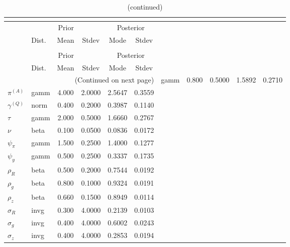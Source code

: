  
\begin{center}
\begin{longtable}{llcccc} 
\caption{Results from posterior maximization (parameters)}\\
 \label{Table:Posterior:1}\\
\toprule 
  & \multicolumn{3}{c}{Prior}  &  \multicolumn{2}{c}{Posterior} \\
  \cmidrule(r{.75em}){2-4} \cmidrule(r{.75em}){5-6}
  & Dist. & Mean  & Stdev & Mode & Stdev \\ 
\midrule \endfirsthead 
\caption{(continued)}\\
 \bottomrule 
  & \multicolumn{3}{c}{Prior}  &  \multicolumn{2}{c}{Posterior} \\
  \cmidrule(r{.75em}){2-4} \cmidrule(r{.75em}){5-6}
  & Dist. & Mean  & Stdev & Mode & Stdev \\ 
\midrule \endhead 
\bottomrule \multicolumn{6}{r}{(Continued on next page)}\endfoot 
\bottomrule\endlastfoot 
${r_{A}}$ & gamm &   0.800 & 0.5000 &   1.5892 &  0.2710 \\ 
${\pi^{(A)}}$ & gamm &   4.000 & 2.0000 &   2.5647 &  0.3559 \\ 
${\gamma^{(Q)}}$ & norm &   0.400 & 0.2000 &   0.3987 &  0.1140 \\ 
${\tau}$ & gamm &   2.000 & 0.5000 &   1.6660 &  0.2767 \\ 
${\nu}$ & beta &   0.100 & 0.0500 &   0.0836 &  0.0172 \\ 
${\psi_\pi}$ & gamm &   1.500 & 0.2500 &   1.4000 &  0.1277 \\ 
${\psi_y}$ & gamm &   0.500 & 0.2500 &   0.3337 &  0.1735 \\ 
${\rho_R}$ & beta &   0.500 & 0.2000 &   0.7544 &  0.0192 \\ 
${\rho_{g}}$ & beta &   0.800 & 0.1000 &   0.9324 &  0.0191 \\ 
${\rho_z}$ & beta &   0.660 & 0.1500 &   0.8949 &  0.0114 \\ 
${\sigma_R}$ & invg &   0.300 & 4.0000 &   0.2139 &  0.0103 \\ 
${\sigma_{g}}$ & invg &   0.400 & 4.0000 &   0.6002 &  0.0243 \\ 
${\sigma_z}$ & invg &   0.400 & 4.0000 &   0.2853 &  0.0194 \\ 
\end{longtable}
 \end{center}
